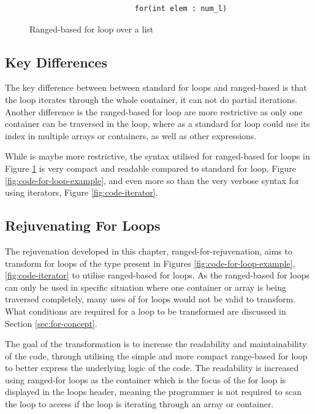 \documentclass[bsc,frontabs,singlespacing,parskip,deptreport]{infthesis}
\begin{document}
\begin{figure}[H]
    \begin{verbatim}
                        for(int elem : num_l)
    \end{verbatim}
    \caption{Ranged-based for loop over a list}
    \centering
    \label{fig:code-ranged-based-for}
\end{figure}

\subsection{Key Differences}

The key difference between between standard for loops and ranged-based is that the loop iterates through the whole container, it can not do partial iterations. Another difference is the ranged-based for loop are more restrictive as only one container can be traversed in the loop, where as a standard for loop could use its index in multiple arrays or containers, as well as other expressions. 

While is maybe more restrictive, the syntax utilised for ranged-based for loops in Figure \ref{fig:code-ranged-based-for} is very compact and readable compared to standard for loop, Figure \ref{fig:code-for-loop-example}, and even more so than the very verbose syntax for using iterators, Figure \ref{fig:code-iterator}.

\subsection{Rejuvenating For Loops}
The rejuvenation developed in this chapter, ranged-for-rejuvenation, aims to transform for loops of the type present in Figures \ref{fig:code-for-loop-example}, \ref{fig:code-iterator} to utilise ranged-based for loops. As the ranged-based for loops can only be used in specific situation where one container or array is being traversed completely, many uses of for loops would not be valid to transform. What conditions are required for a loop to be transformed are discussed in Section \ref{sec:for-concept}. 

The goal of the transformation is to increase the readability and maintainability of the code, through utilising the simple and more compact range-based for loop to better express the underlying logic of the code. The readability is increased using ranged-for loops as the container which is the focus of the for loop is displayed in the loops header, meaning the programmer is not required to scan the loop to access if the loop is iterating through an array or container.
\end{document}
